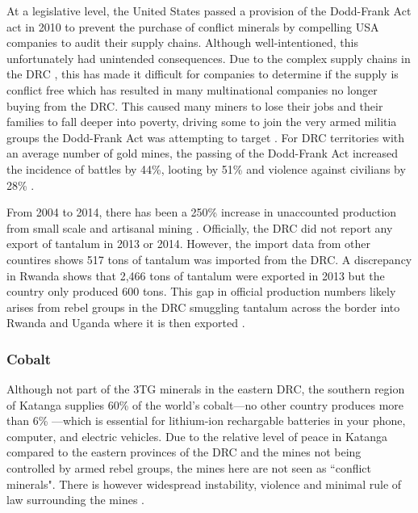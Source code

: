 \documentclass{article}
\begin{document}
At a legislative level, the United States passed a provision of the Dodd-Frank Act act in 2010 to prevent the purchase of conflict minerals by compelling USA companies to audit their supply chains. Although well-intentioned, this unfortunately had unintended consequences. Due to the complex supply chains in the DRC \cite{moran2015global, reller2009mobile}, this has made it difficult for companies to determine if the supply is conflict free which has resulted in many multinational companies no longer buying from the DRC. This caused many miners to lose their jobs and their families to fall deeper into poverty, driving some to join the very armed militia groups the Dodd-Frank Act was attempting to target \cite{cfr2021congoconflict}. For DRC territories with an average number of gold mines, the passing of the Dodd-Frank Act increased the incidence of battles by 44\%, looting by 51\% and violence against civilians by 28\% \cite{stoop2018more}. 

From 2004 to 2014, there has been a 250\% increase in unaccounted production from small scale and artisanal mining \cite{mancheri2018resilience}. Officially, the DRC did not report any export of tantalum in 2013 or 2014. However, the import data from other countires shows 517 tons of tantalum was imported from the DRC. A discrepancy in Rwanda shows that 2,466 tons of tantalum were exported in 2013 but the country only produced 600 tons. This gap in official production numbers likely arises from rebel groups in the DRC smuggling tantalum across the border into Rwanda and Uganda where it is then exported \cite{mancheri2018resilience}.


\subsubsection{Cobalt}
Although not part of the 3TG minerals in the eastern DRC, the southern region of Katanga supplies 60\% of the world's cobalt---no other country produces more than 6\% \cite{shedd2017cobalt}---which is essential for lithium-ion rechargable batteries in your phone, computer, and electric vehicles. Due to the relative level of peace in Katanga compared to the eastern provinces of the DRC and the mines not being controlled by armed rebel groups, the mines here are not seen as ``conflict minerals". There is however widespread instability, violence and minimal rule of law surrounding the mines \cite{scheele2016cobalt}.
\end{document}
